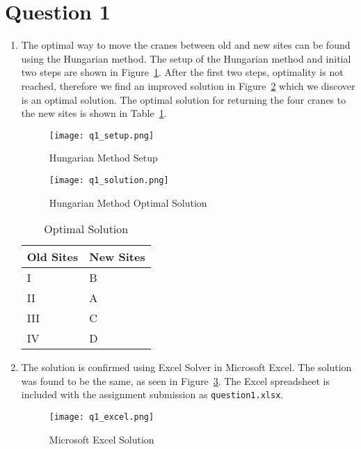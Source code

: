 \section*{Question 1}
\begin{enumerate}[label=(\alph*)]
\item
The optimal way to move the cranes between old and new sites can be found using the Hungarian method. The setup of the Hungarian method and initial two steps are shown in Figure~\ref{fig:q1_initial}. After the first two steps, optimality is not reached, therefore we find an improved solution in Figure~\ref{fig:q1_answer} which we discover is an optimal solution. The optimal solution for returning the four cranes to the new sites is shown in Table~\ref{tab:q1}.

\begin{figure}[htp]
\centering
\caption{\label{fig:q1_initial}Hungarian Method Setup}
\texttt{[image: q1\_setup.png]}
\end{figure}

\begin{figure}[htp]
\centering
\caption{\label{fig:q1_answer}Hungarian Method Optimal Solution}
\texttt{[image: q1\_solution.png]}
\end{figure}

\begin{table}[htp]
\centering
\caption{\label{tab:q1}Optimal Solution}
\begin{tabular}{|l|l|}
	\hline
	Old Sites	& New Sites	\\ \hline
	I			& B			\\ \hline
	II			& A			\\ \hline
	III			& C			\\ \hline
	IV			& D			\\ \hline
\end{tabular}
\end{table}
\clearpage

\item
The solution is confirmed using Excel Solver in Microsoft Excel. The solution was found to be the same, as seen in Figure~\ref{fig:q1_excel}. The Excel spreadsheet is included with the assignment submission as \texttt{question1.xlsx}.

\begin{figure}[htp]
\centering
\caption{\label{fig:q1_excel}Microsoft Excel Solution}
\texttt{[image: q1\_excel.png]}
\end{figure}

\end{enumerate}
